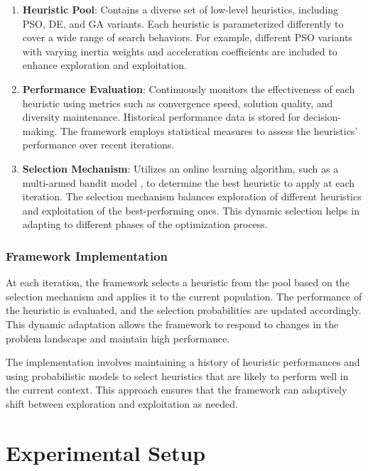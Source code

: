 \documentclass[conference]
{IEEEtran}
\begin{document}
\begin{enumerate}
    \item \textbf{Heuristic Pool}: Contains a diverse set of low-level heuristics, including PSO, DE, and GA variants. Each heuristic is parameterized differently to cover a wide range of search behaviors. For example, different PSO variants with varying inertia weights and acceleration coefficients are included to enhance exploration and exploitation.
    \item \textbf{Performance Evaluation}: Continuously monitors the effectiveness of each heuristic using metrics such as convergence speed, solution quality, and diversity maintenance. Historical performance data is stored for decision-making. The framework employs statistical measures to assess the heuristics' performance over recent iterations.
    \item \textbf{Selection Mechanism}: Utilizes an online learning algorithm, such as a multi-armed bandit model \cite{fialho2010analysis}, to determine the best heuristic to apply at each iteration. The selection mechanism balances exploration of different heuristics and exploitation of the best-performing ones. This dynamic selection helps in adapting to different phases of the optimization process.
\end{enumerate}

\subsubsection{Framework Implementation}

At each iteration, the framework selects a heuristic from the pool based on the selection mechanism and applies it to the current population. The performance of the heuristic is evaluated, and the selection probabilities are updated accordingly. This dynamic adaptation allows the framework to respond to changes in the problem landscape and maintain high performance.

The implementation involves maintaining a history of heuristic performances and using probabilistic models to select heuristics that are likely to perform well in the current context. This approach ensures that the framework can adaptively shift between exploration and exploitation as needed.

\section{Experimental Setup}
\end{document}
